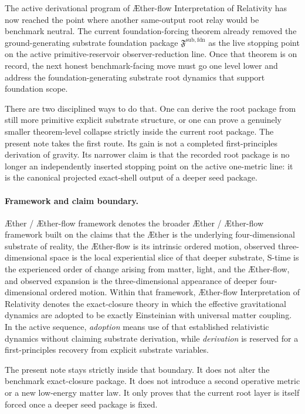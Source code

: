 \documentclass[11pt]{article}
\newcommand{\Aether}{\AE{}ther}
\newcommand{\Aflow}{\AE{}ther-flow}
\newcommand{\TheoryName}{\Aflow{} Interpretation of Relativity}
\newcommand{\TheoryProgram}{\Aether{} / \Aflow{} framework}
\newcommand{\FoundationPackage}{\mathfrak F^{\mathrm{sub,fdn}}}
\begin{document}
The active derivational program of \TheoryName{} has now reached the point where another same-output root relay would be benchmark neutral. The current foundation-forcing theorem already removed the ground-generating substrate foundation package \(\FoundationPackage\) as the live stopping point on the active primitive-reservoir observer-reduction line. Once that theorem is on record, the next honest benchmark-facing move must go one level lower and address the foundation-generating substrate root dynamics that support foundation scope.

There are two disciplined ways to do that. One can derive the root package from still more primitive explicit substrate structure, or one can prove a genuinely smaller theorem-level collapse strictly inside the current root package. The present note takes the first route. Its gain is not a completed first-principles derivation of gravity. Its narrower claim is that the recorded root package is no longer an independently inserted stopping point on the active one-metric line: it is the canonical projected exact-shell output of a deeper seed package.

\paragraph{Framework and claim boundary.}
\TheoryProgram{} denotes the broader \Aether{} / \Aflow{} framework built on the claims that the \Aether{} is the underlying four-dimensional substrate of reality, the \Aflow{} is its intrinsic ordered motion, observed three-dimensional space is the local experiential slice of that deeper substrate, S-time is the experienced order of change arising from matter, light, and the \Aflow{}, and observed expansion is the three-dimensional appearance of deeper four-dimensional ordered motion. Within that framework, \TheoryName{} denotes the exact-closure theory in which the effective gravitational dynamics are adopted to be exactly Einsteinian with universal matter coupling. In the active sequence, \emph{adoption} means use of that established relativistic dynamics without claiming substrate derivation, while \emph{derivation} is reserved for a first-principles recovery from explicit substrate variables.

The present note stays strictly inside that boundary. It does not alter the benchmark exact-closure package. It does not introduce a second operative metric or a new low-energy matter law. It only proves that the current root layer is itself forced once a deeper seed package is fixed.
\end{document}
